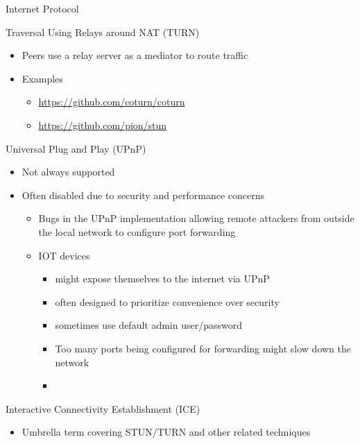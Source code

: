 \begin{block}{Internet Protocol}
\begin{block}{Traversal Using Relays around NAT (TURN)}
\protect\hypertarget{notes__02021-internet-protocol.md__traversal-using-relays-around-nat-turn}{}
\begin{itemize}
\item
  Peers use a relay server as a mediator to route traffic
\item
  Examples

  \begin{itemize}
  \item
    \url{https://github.com/coturn/coturn}
  \item
    \url{https://github.com/pion/stun}
  \end{itemize}
\end{itemize}
\end{block}

\begin{block}{Universal Plug and Play (UPnP)}
\protect\hypertarget{notes__02021-internet-protocol.md__universal-plug-and-play-upnp}{}
\begin{itemize}
\tightlist
\item
  Not always supported
\item
  Often disabled due to security and performance concerns

  \begin{itemize}
  \tightlist
  \item
    Bugs in the UPnP implementation allowing remote attackers from
    outside the local network to configure port forwarding
  \item
    IOT devices

    \begin{itemize}
    \tightlist
    \item
      might expose themselves to the internet via UPnP
    \item
      often designed to prioritize convenience over security
    \item
      sometimes use default admin user/password
    \item
      Too many ports being configured for forwarding might slow down the
      network
    \item
    \end{itemize}
  \end{itemize}
\end{itemize}
\end{block}

\begin{block}{Interactive Connectivity Establishment (ICE)}
\protect\hypertarget{notes__02021-internet-protocol.md__interactive-connectivity-establishment-ice}{}
\begin{itemize}
\tightlist
\item
  Umbrella term covering STUN/TURN and other related techniques
\end{itemize}
\end{block}


\end{block}
